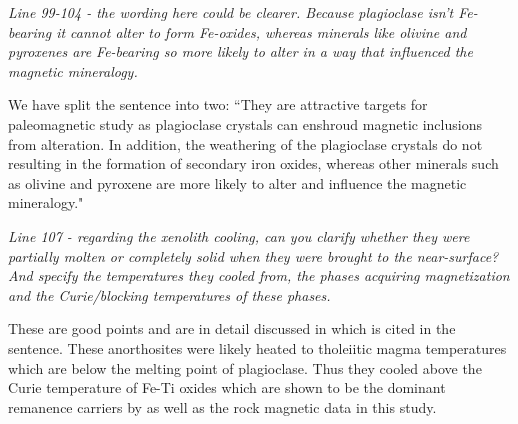 \documentclass[11pt, letterpaper]{article}
\begin{document}
\begin{flushleft}
\textit{Line 99-104 - the wording here could be clearer. Because plagioclase isn't Fe-bearing it cannot alter to form Fe-oxides, whereas minerals like olivine and pyroxenes are Fe-bearing so more likely to alter in a way that influenced the magnetic mineralogy.}

We have split the sentence into two: ``They are attractive targets for paleomagnetic study as plagioclase crystals can enshroud magnetic inclusions from alteration. In addition, the weathering of the plagioclase crystals do not resulting in the formation of secondary iron oxides, whereas other minerals such as olivine and pyroxene are more likely to alter and influence the magnetic mineralogy."

\textit{Line 107 - regarding the xenolith cooling, can you clarify whether they were partially molten or completely solid when they were brought to the near-surface? And specify the temperatures they cooled from, the phases acquiring magnetization and the Curie/blocking temperatures of these phases.}

These are good points and are in detail discussed in \cite{Zhang2021b} which is cited in the sentence. These anorthosites were likely heated to tholeiitic magma temperatures which are below the melting point of plagioclase. Thus they cooled above the Curie temperature of Fe-Ti oxides which are shown to be the dominant remanence carriers by \cite{Zhang2021a} as well as the rock magnetic data in this study. 


\end{flushleft}
\end{document}
